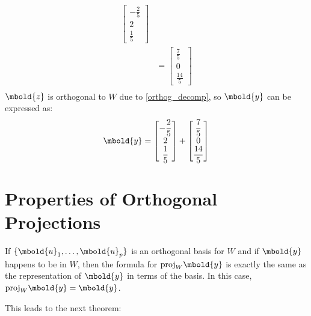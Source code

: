 \documentclass[12pt letter]{report}
\begin{document}
{{\begin{align*}
\begin{bmatrix}
                                                                 -\frac{2}{5} \\
                                                                 2            \\
                                                                 \frac{1}{5}
                                                               \end{bmatrix} \\
                & = \begin{bmatrix}
                      \frac{7}{5} \\
                      0           \\
                      \frac{14}{5}
                    \end{bmatrix}                                            \\
    \end{align*}
    $\mbold{z}$ is orthogonal to $W$ due to \ref{orthog_decomp}, so $\mbold{y}$ can be expressed as:
    \[
      \mbold{y} = \begin{bmatrix}
        \displaystyle -\frac{2}{5} \\
        \displaystyle 2            \\
        \displaystyle \frac{1}{5}
      \end{bmatrix}  +  \begin{bmatrix}
        \displaystyle \frac{7}{5} \\
        \displaystyle 0           \\
        \displaystyle \frac{14}{5}
      \end{bmatrix}
    \]
  }
}

\section{Properties of Orthogonal Projections}

If $\{\mbold{u}_1, \ldots, \mbold{u}_p\} $ is an orthogonal basis for $W$ and if $\mbold{y}$ happens to be in $W$, then
the formula for $\text{proj}_W \mbold{y}$ is exactly the same as the representation of $\mbold{y}$ in terms of the
basis. In this case, $\text{proj}_W \mbold{y} = \mbold{y}$.


This leads to the next theorem:
\end{document}
